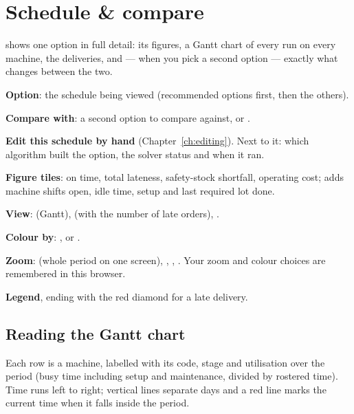 \chapter{Schedule \& compare}\label{ch:schedule}

 shows one option in full detail: its figures, a Gantt chart of every run on every
machine, the deliveries, and --- when you pick a second option --- exactly what changes between the two.


\begin{callouts}
  \item[1] \textbf{Option}: the schedule being viewed (recommended options first, then the others).
  \item[2] \textbf{Compare with}: a second option to compare against, or .
  \item[3] \textbf{Edit this schedule by hand} (Chapter~\ref{ch:editing}). Next to it: which algorithm built the
           option, the solver status and when it ran.
  \item[4] \textbf{Figure tiles}: on time, total lateness, safety-stock shortfall, operating cost;  adds machine shifts open, idle time, setup and last required lot done.
  \item[5] \textbf{View}:  (Gantt),  (with the number of late orders), .
  \item[6] \textbf{Colour by}: ,  or .
  \item[7] \textbf{Zoom}:  (whole period on one screen), , , . Your zoom
           and colour choices are remembered in this browser.
  \item[8] \textbf{Legend}, ending with the red diamond for a late delivery.
\end{callouts}

\section{Reading the Gantt chart}\label{sec:gantt}

Each row is a machine, labelled with its code, stage and utilisation over the period (busy time including
setup and maintenance, divided by rostered time). Time runs left to right; vertical lines separate days and
a red  line marks the current time when it falls inside the period.

